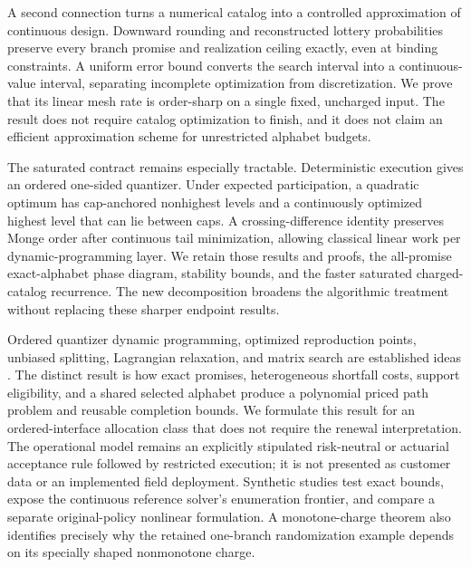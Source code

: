 A second connection turns a numerical catalog into a controlled approximation of continuous design. Downward rounding and reconstructed lottery probabilities preserve every branch promise and realization ceiling exactly, even at binding constraints. A uniform error bound converts the search interval into a continuous-value interval, separating incomplete optimization from discretization. We prove that its linear mesh rate is order-sharp on a single fixed, uncharged input. The result does not require catalog optimization to finish, and it does not claim an efficient approximation scheme for unrestricted alphabet budgets.

The saturated contract remains especially tractable. Deterministic execution gives an ordered one-sided quantizer. Under expected participation, a quadratic optimum has cap-anchored nonhighest levels and a continuously optimized highest level that can lie between caps. A crossing-difference identity preserves Monge order after continuous tail minimization, allowing classical linear work per dynamic-programming layer. We retain those results and proofs, the all-promise exact-alphabet phase diagram, stability bounds, and the faster saturated charged-catalog recurrence. The new decomposition broadens the algorithmic treatment without replacing these sharper endpoint results.

Ordered quantizer dynamic programming, optimized reproduction points, unbiased splitting, Lagrangian relaxation, and matrix search are established ideas \citep{Wu1991,PagesWilbertz2012,CrociEtAl2022,JourdainPages2021,HandlerZang1980}. The distinct result is how exact promises, heterogeneous shortfall costs, support eligibility, and a shared selected alphabet produce a polynomial priced path problem and reusable completion bounds. We formulate this result for an ordered-interface allocation class that does not require the renewal interpretation. The operational model remains an explicitly stipulated risk-neutral or actuarial acceptance rule followed by restricted execution; it is not presented as customer data or an implemented field deployment. Synthetic studies test exact bounds, expose the continuous reference solver's enumeration frontier, and compare a separate original-policy nonlinear formulation. A monotone-charge theorem also identifies precisely why the retained one-branch randomization example depends on its specially shaped nonmonotone charge.
